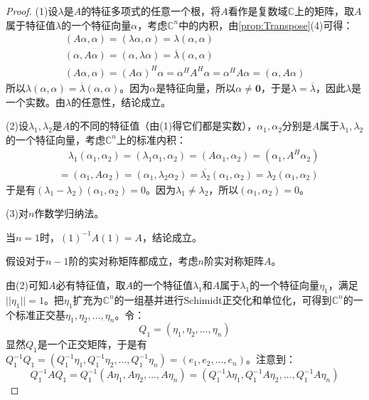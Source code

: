 \begin{proof}
	(1)设$\lambda$是$A$的特征多项式的任意一个根，将$A$看作是复数域$\mathbb{C}$上的矩阵，取$A$属于特征值$\lambda$的一个特征向量$\alpha$，考虑$\mathbb{C}^{n}$中的内积，由\cref{prop:Transpose}(4)可得：
	\begin{gather*}
		(A\alpha,\alpha)=(\lambda\alpha,\alpha)=\lambda(\alpha,\alpha) \\
		(\alpha,A\alpha)=(\alpha,\lambda\alpha)=\overline{\lambda}(\alpha,\alpha) \\
		(A\alpha,\alpha)=(A\alpha)^H\alpha=\alpha^HA^H\alpha=\alpha^H A\alpha=(\alpha,A\alpha)
	\end{gather*}
	所以$\lambda(\alpha,\alpha)=\overline{\lambda}(\alpha,\alpha)$。因为$\alpha$是特征向量，所以$\alpha\ne\mathbf{0}$，于是$\lambda=\overline{\lambda}$，因此$\lambda$是一个实数。由$\lambda$的任意性，结论成立。\par
	(2)设$\lambda_1,\lambda_2$是$A$的不同的特征值（由(1)得它们都是实数），$\alpha_1,\alpha_2$分别是$A$属于$\lambda_1,\lambda_2$的一个特征向量，考虑$\mathbb{C}^{n}$上的标准内积：
	\begin{align*}
		&\quad\lambda_1(\alpha_1,\alpha_2)
		=(\lambda_1\alpha_1,\alpha_2)=(A\alpha_1,\alpha_2)=(\alpha_1,A^H\alpha_2) \\
		&=(\alpha_1,A\alpha_2)=(\alpha_1,\lambda_2\alpha_2)=\overline{\lambda_2}(\alpha_1,\alpha_2)=\lambda_2(\alpha_1,\alpha_2)
	\end{align*}
	于是有$(\lambda_1-\lambda_2)(\alpha_1,\alpha_2)=0$。因为$\lambda_1\ne\lambda_2$，所以$(\alpha_1,\alpha_2)=0$。\par
	(3)对$n$作数学归纳法。\par
	当$n=1$时，$(1)^{-1}A(1)=A$，结论成立。\par
	假设对于$n-1$阶的实对称矩阵都成立，考虑$n$阶实对称矩阵$A$。\par
	由(2)可知$A$必有特征值，取$A$的一个特征值$\lambda_1$和$A$属于$\lambda_1$的一个特征向量$\eta_1$，满足$||\eta_1||=1$。把$\eta_1$扩充为$\mathbb{C}^{n}$的一组基并进行Schimidt正交化和单位化，可得到$\mathbb{C}^{n}$的一个标准正交基$\eta_1,\eta_2,\dots,\eta_n$。令：
	\begin{equation*}
		Q_1=(\eta_1,\eta_2,\dots,\eta_n)
	\end{equation*}
	显然$Q_1$是一个正交矩阵，于是有$Q_1^{-1}Q_1=(Q_1^{-1}\eta_1,Q_1^{-1}\eta_2,\dots,Q_1^{-1}\eta_n)=(e_1,e_2,\dots,e_n)$。注意到：
	\begin{equation*}
		Q_1^{-1}AQ_1=Q_1^{-1}(A\eta_1,A\eta_2,\dots,A\eta_n)=(Q_1^{-1}\lambda\eta_1,Q_1^{-1}A\eta_2,\dots,Q_1^{-1}A\eta_n)

\end{equation*}
\end{proof}

